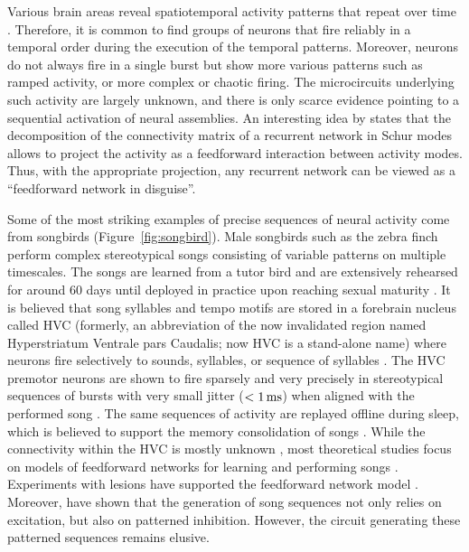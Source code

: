     Various brain areas reveal spatiotemporal activity patterns that repeat
    over time \cite[e.g.,][]{Wilson1994, Kenet2003, Berkes2011}. Therefore, it
    is common to find groups of neurons that fire reliably in a temporal order
    during the execution of the temporal patterns. Moreover, neurons do not
    always fire in a single burst but show more various patterns such as ramped
    activity, or more complex or chaotic firing. The microcircuits
    underlying such activity are largely unknown, and there is only scarce
    evidence pointing to a sequential activation of neural assemblies. An
    interesting idea by \cite{Goldman2009} states that the decomposition of the
    connectivity matrix of a recurrent network in Schur modes allows to project
    the activity as a feedforward interaction between activity modes. Thus,
    with the appropriate projection, any recurrent network can be viewed as a
    ``feedforward network in disguise''.

    Some of the most striking examples of precise sequences of neural activity
    come from songbirds (Figure~\ref{fig:songbird}). Male songbirds such as the zebra finch perform complex
    stereotypical songs consisting of variable patterns on multiple timescales.
    The songs are learned from a tutor bird and are extensively rehearsed for
    around 60 days until deployed in practice upon reaching sexual maturity
    \citep{George1995, Doupe2004}. It is believed that song syllables and tempo
    motifs are stored in a forebrain nucleus called HVC (formerly, an
    abbreviation of the now invalidated region named Hyperstriatum Ventrale pars
    Caudalis; now HVC is a stand-alone name) where neurons fire
    selectively to sounds, syllables, or sequence of syllables \citep{Yu1996}.
    The HVC premotor neurons are shown to fire sparsely and very precisely in
    stereotypical sequences of bursts with very small jitter ($<1\,\rm ms$)
    when aligned with the performed song \citep{Hahnloser2002}. The same
    sequences of activity are replayed offline during sleep, which is believed
    to support the memory consolidation of songs \citep{Dave2000}. While the
    connectivity within the HVC is mostly unknown \citep{Hamaguchi2012,
    Poole2012}, most theoretical studies focus on models of feedforward
    networks for learning and performing songs \citep[e.g.,][]{Li2006,
    Long2010, Hanuschkin2011}. Experiments with lesions have supported the
    feedforward network model \citep{Poole2012}. Moreover, \cite{Kosche2015}
    have shown that the generation of song sequences not only relies on
    excitation, but also on patterned inhibition. However, the circuit generating these
    patterned sequences remains elusive.  

